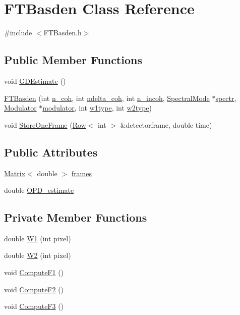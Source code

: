 \hypertarget{classFTBasden}{
\section{FTBasden Class Reference}
\label{classFTBasden}
}


{\ttfamily \#include $<$FTBasden.h$>$}

\subsection*{Public Member Functions}
\begin{DoxyCompactItemize}
\item 
void \hyperlink{classFTBasden_acd78f51a4e9289f0baa700911a8d57e8}{GDEstimate} ()
\item 
\hyperlink{classFTBasden_a5f5d73040e778dbf7115ab23f6bb9c9d}{FTBasden} (int \hyperlink{classFTBasden_a73eaee344474c1a9684092fc153c276a}{n\_\-coh}, int \hyperlink{classFTBasden_ad4f3178302c51d384fd6982291b1c013}{ndelta\_\-coh}, int \hyperlink{classFTBasden_a08a54e66d27db92948d214db32a271d4}{n\_\-incoh}, \hyperlink{classSpectralMode}{SpectralMode} $\ast$\hyperlink{classFTBasden_aed5e060486471328c4b0cb30b828d242}{spectr}, \hyperlink{classModulator}{Modulator} $\ast$\hyperlink{classFTBasden_a1042a3192c3eeedb17421dea33637fc2}{modulator}, int \hyperlink{classFTBasden_abebf10bcdc72528f9c98459e91524545}{w1type}, int \hyperlink{classFTBasden_ac2f9b89d66840aba0f7ce01e5d3d0386}{w2type})
\item 
void \hyperlink{classFTBasden_a76fe6fade8b81a074ea5e1724dbe4d6c}{StoreOneFrame} (\hyperlink{classRow}{Row}$<$ int $>$ \&detectorframe, double time)
\end{DoxyCompactItemize}
\subsection*{Public Attributes}
\begin{DoxyCompactItemize}
\item 
\hyperlink{classMatrix}{Matrix}$<$ double $>$ \hyperlink{classFTBasden_a4dcdeaee548ee6378d126b348c943f39}{frames}
\item 
double \hyperlink{classFTBasden_a306a1bc5d8932b9eb3ba98d670ea631b}{OPD\_\-estimate}
\end{DoxyCompactItemize}
\subsection*{Private Member Functions}
\begin{DoxyCompactItemize}
\item 
double \hyperlink{classFTBasden_a8d1e981f8af57e71a569f026b8ab9980}{W1} (int pixel)
\item 
double \hyperlink{classFTBasden_abe46b656653caaabd727215148634ff8}{W2} (int pixel)
\item 
void \hyperlink{classFTBasden_a8ccb1870a2b2676f9c8b89a79b80deef}{ComputeF1} ()
\item 
void \hyperlink{classFTBasden_a1a78fe9de40c29a7379ff938e5f87cb3}{ComputeF2} ()
\item 
void \hyperlink{classFTBasden_afb9ff4ea4467ec2245c72dbda5dd55a1}{ComputeF3} ()
\end{DoxyCompactItemize}
